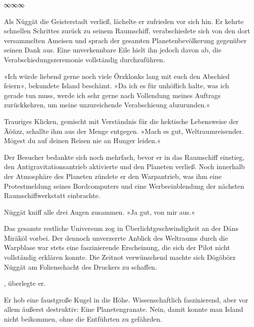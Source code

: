 \begin{center}
∞∞∞
\end{center}

Als Nüggät die Geisterstadt verließ, lächelte er zufrieden vor sich hin. Er kehrte schnellen Schrittes zurück zu seinem Raumschiff, verabschiedete sich von den dort versammelten Ameisen und sprach der gesamten Planetenbevölkerung gegenüber seinen Dank aus. Eine unverkennbare Eile hielt ihn jedoch davon ab, die Verabschiedungszeremonie vollständig durchzuführen.

»Ich würde liebend gerne noch viele Örzklonks lang mit euch den Abschied feiern«, bekundete Island beschämt. »Da ich es für unhöflich halte, was ich gerade tun muss, werde ich sehr gerne nach Vollendung meines Auftrags zurückkehren, um meine unzureichende Verabschieung abzurunden.«

Trauriges Klicken, gemischt mit Verständnis für die hektische Lebensweise der Äöüzz, schallte ihm aus der Menge entgegen. »Mach es gut, Weltraumreisender. Mögest du auf deinen Reisen nie an Hunger leiden.«

Der Besucher bedankte sich noch mehrfach, bevor er in das Raumschiff einstieg, den Antigravitationsantrieb aktivierte und den Planeten verließ. Noch innerhalb der Atmosphäre des Planeten zündete er den Warpantrieb, was ihm eine Protestmeldung seines Bordcomputers und eine Werbeeinblendung der nächsten Raumschiffwerkstatt einbrachte.


Nüggät kniff alle drei Augen zusammen. »Ja gut, von mir aus.«

Das gesamte restliche Universum zog in Überlichtgeschwindigkeit an der Däns Miräköl vorbei. Der dennoch unverzerrte Anblick des Weltraums durch die Warpblase war stets eine faszinierende Erscheinung, die sich der Pilot nicht vollständig erklären konnte. Die Zeitnot verwünschend machte sich Dögöbörz Nüggät am Folienschacht des Druckers zu schaffen.

, überlegte er. 

Er hob eine faustgroße Kugel in die Höhe. Wissenschaftlich faszinierend, aber vor allem äußerst destruktiv: Eine Planetengranate. Nein, damit konnte man Island nicht beikommen, ohne die Entführten zu gefährden.


